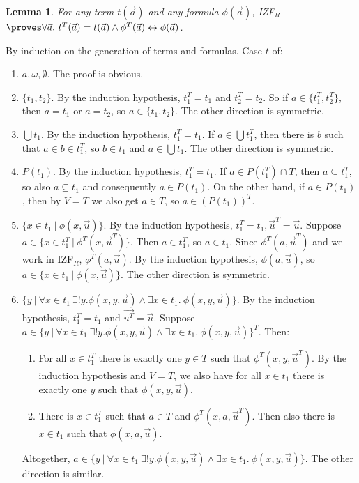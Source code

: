 \documentclass{LMCS}
\newtheorem{lemma}[thm]{Lemma}
\newcommand\iffl{\ensuremath{\leftrightarrow}}
\newcommand{\p}{\proves}
\newcommand{\izfr}{IZF${}_R$}
\begin{document}
\begin{lemma}\label{tt}
For any term $t(\vec{a})$ and any formula $\phi(\vec{a})$, \izfr $\p \forall
\vec{a}.\ t^T(\vec{a}) = t(\vec{a}) \land \phi^T(\vec{a}) \iffl \phi(\vec{a})$.
\end{lemma}
\proof By induction on the generation of terms and formulas. 
Case $t$ of:
\begin{enumerate}[$\bullet$]
\item $a, \omega, \emptyset$. The proof is obvious. 
\item $\{ t_1, t_2 \}$. By the induction hypothesis, $t_1^T = t_1$ and
$t_2^T = t_2$. So if $a \in \{ t_1^T, t_2^T \}$, then $a = t_1$ or $a = t_2$, so 
$a \in \{ t_1, t_2 \}$. The other direction is symmetric.
\item $\bigcup t_1$. By the induction hypothesis, $t_1^T = t_1$. If $a \in \bigcup t_1^T$, then there is
$b$ such that $a \in b \in t_1^T$, so $b \in t_1$ and $a \in \bigcup t_1$.
The other direction is symmetric.
\item $P(t_1)$. By the induction hypothesis, $t_1^T = t_1$. If $a \in P(t_1^T) \cap T$, 
then $a \subseteq t_1^T$, so also $a \subseteq t_1$ and consequently $a \in P(t_1)$. 
On the other hand, if $a \in
P(t_1)$, then by $V=T$ we also get $a \in T$, so $a \in (P(t_1))^T$. 
\item $\{ x \in t_1\ |\ \phi(x, \vec{u}) \}$. By the induction hypothesis,
$t_1^T = t_1, \vec{u}^T = \vec{u}$. Suppose $a \in \{ x \in t_1^T\ |\
\phi^T(x, \vec{u}^T) \}$. Then $a \in t_1^T$, so $a \in t_1$. Since 
$\phi^T(a, \vec{u}^T)$ and we work in \izfr, $\phi^T(a, \vec{u})$. By the
induction hypothesis, $\phi(a, \vec{u})$, so $a \in \{ x \in t_1\ |\ \phi(x,
\vec{u}) \}$. The other direction is symmetric. 
\item $\{ y\ |\ \forall x \in t_1\ \exists !y. \phi(x, y, \vec{u}) \land \exists
x \in t_1.\ \phi(x, y, \vec{u}) \}$. By the induction hypothesis, $t_1^T =
t_1$ and $\vec{u^T} = \vec{u}$. Suppose $a \in \{ y\ |\ \forall x \in t_1\ \exists !y. \phi(x,
y, \vec{u}) \land \exists x \in t_1.\ \phi(x, y, \vec{u}) \}^T$. Then:
\begin{enumerate}[$-$]
\item For all $x \in t_1^T$ there is exactly one $y \in T$ such that $\phi^T(x,
y, \vec{u}^T)$. By the induction hypothesis and $V=T$, we also have for all $x \in t_1$
there is exactly one $y$ such that $\phi(x, y, \vec{u})$.  
\item There is $x \in t_1^T$ such that $a \in T$ and $\phi^T(x, a,
\vec{u}^T)$. Then also there is $x \in t_1$ such that $\phi(x, a, \vec{u})$.
\end{enumerate}
Altogether, $a \in \{ y\ |\ \forall x \in t_1\ \exists !y. \phi(x, y, \vec{u})
\land \exists x \in t_1.\ \phi(x, y, \vec{u}) \}$. The other direction is
similar. 
\end{enumerate}
\end{document}
